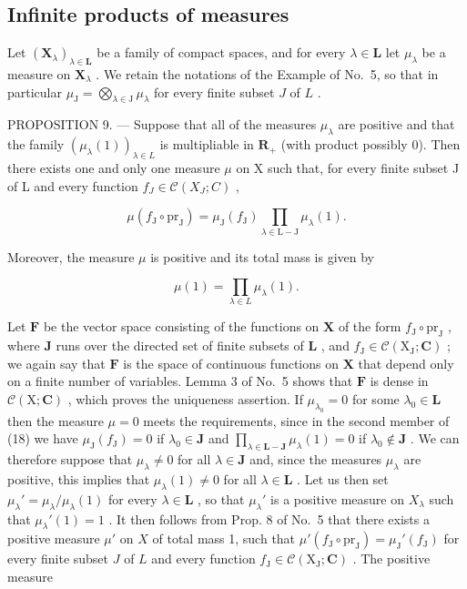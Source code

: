 \subsection{Infinite products of measures}

Let \((\mathbf{X}_{\lambda})_{\lambda \in \mathbf{L}}\) be a family of compact spaces, and for every \(\lambda \in \mathbf{L}\) let \(\mu_{\lambda}\) be a measure on \(\mathbf{X}_{\lambda}\) . We retain the notations of the Example of No.~5, so that in particular \(\mu_{\mathrm{J}} = \bigotimes_{\lambda \in \mathrm{J}} \mu_{\lambda}\) for every finite subset \(J\) of \(L\) .

PROPOSITION 9. --- Suppose that all of the measures \(\mu_{\lambda}\) are positive and that the family \((\mu_{\lambda}(1))_{\lambda \in L}\) is multipliable in \(\mathbf{R}_{+}\) (with product possibly 0). Then there exists one and only one measure \(\mu\) on X such that, for every finite subset J of L and every function \(f_{J} \in \mathcal{C}(X_J; C)\) ,

\[
\mu (f _ {\mathrm{J}} \circ \mathrm{pr} _ {\mathrm{J}}) = \mu_ {\mathrm{J}} (f _ {\mathrm{J}}) \prod_ {\lambda \in \mathrm{L} - \mathrm{J}} \mu_ {\lambda} (1).\tag{18}
\]

Moreover, the measure \(\mu\) is positive and its total mass is given by

\[
\mu (1) = \prod_ {\lambda \in L} \mu_ {\lambda} (1).\tag{19}
\]

Let \(\mathbf{F}\) be the vector space consisting of the functions on \(\mathbf{X}\) of the form \(f_{\mathrm{J}} \circ \mathrm{pr}_{\mathrm{J}}\) , where \(\mathbf{J}\) runs over the directed set of finite subsets of \(\mathbf{L}\) , and \(f_{\mathrm{J}} \in \mathcal{C}(\mathrm{X}_{\mathrm{J}}; \mathbf{C})\) ; we again say that \(\mathbf{F}\) is the space of continuous functions on \(\mathbf{X}\) that depend only on a finite number of variables. Lemma 3 of No.~5 shows that \(\mathbf{F}\) is dense in \(\mathcal{C}(\mathrm{X}; \mathbf{C})\) , which proves the uniqueness assertion. If \(\mu_{\lambda_0} = 0\) for some \(\lambda_0 \in \mathbf{L}\) then the measure \(\mu = 0\) meets the requirements, since in the second member of (18) we have \(\mu_{\mathrm{J}}(f_{\mathrm{J}}) = 0\) if \(\lambda_0 \in \mathbf{J}\) and \(\prod_{\lambda \in \mathbf{L} - \mathbf{J}} \mu_{\lambda}(1) = 0\) if \(\lambda_0 \notin \mathbf{J}\) . We can therefore suppose that \(\mu_{\lambda} \neq 0\) for all \(\lambda \in \mathbf{J}\) and, since the measures \(\mu_{\lambda}\) are positive, this implies that \(\mu_{\lambda}(1) \neq 0\) for all \(\lambda \in \mathbf{L}\) . Let us then set \(\mu_{\lambda}' = \mu_{\lambda}/\mu_{\lambda}(1)\) for every \(\lambda \in \mathbf{L}\) , so that \(\mu_{\lambda}'\) is a positive measure on \(X_{\lambda}\) such that \(\mu_{\lambda}'(1) = 1\) . It then follows from Prop. 8 of No.~5 that there exists a positive measure \(\mu'\) on \(X\) of total mass 1, such that \(\mu'(f_{\mathrm{J}} \circ \mathrm{pr}_{\mathrm{J}}) = \mu_{\mathrm{J}}'(f_{\mathrm{J}})\) for every finite subset \(J\) of \(L\) and every function \(f_{\mathrm{J}} \in \mathcal{C}(\mathrm{X}_{\mathrm{J}}; \mathbf{C})\) . The positive measure

